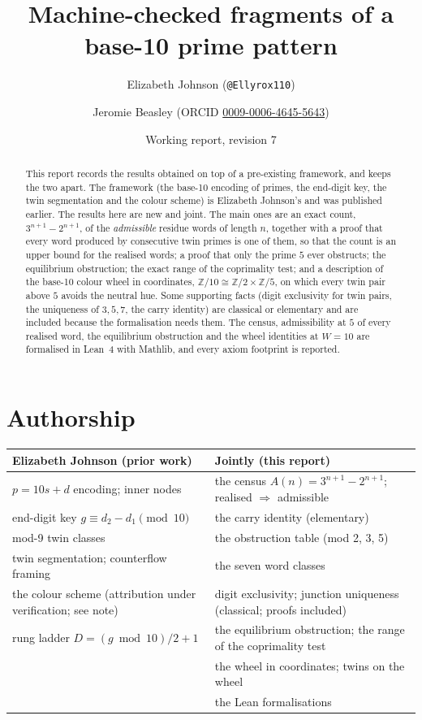 \documentclass[11pt]{article}
\title{\bfseries Machine-checked fragments of a\\ base-10 prime pattern}
\author{Elizabeth Johnson (\texttt{@Ellyrox110}) \and Jeromie Beasley (ORCID \href{https://orcid.org/0009-0006-4645-5643}{0009-0006-4645-5643})}
\date{Working report, revision 7}
\newcommand{\Z}{\mathbb Z}
\theoremstyle{plain}
\theoremstyle{definition}
\theoremstyle{remark}
\begin{document}
\maketitle

\begin{abstract}
\noindent
This report records the results obtained on top of a pre-existing framework, and keeps the two
apart. The framework (the base-10 encoding of primes, the end-digit key, the twin segmentation and
the colour scheme) is Elizabeth Johnson's and was published earlier. The results here are new and
joint. The main ones are an exact count, $3^{n+1}-2^{n+1}$, of the \emph{admissible} residue words
of length $n$, together with a proof that every word produced by consecutive twin primes is one of
them, so that the count is an upper bound for the realised words; a proof that only the prime $5$
ever obstructs; the equilibrium obstruction; the exact range of the coprimality test; and a
description of the base-10 colour wheel in coordinates, $\Z/10\cong\Z/2\times\Z/5$, on which every
twin pair above $5$ avoids the neutral hue. Some supporting facts (digit exclusivity for twin
pairs, the uniqueness of $3,5,7$, the carry identity) are classical or elementary and are included
because the formalisation needs them. The census, admissibility at $5$ of every realised word, the
equilibrium obstruction and the wheel identities at $W=10$ are formalised in Lean~4 with Mathlib,
and every axiom footprint is reported.
\end{abstract}

\section*{Authorship}

\begin{center}
\begin{tabular}{@{}p{}p{}@{}}
\toprule
\textbf{Elizabeth Johnson (prior work)} & \textbf{Jointly (this report)}\\
\midrule
$p=10s+d$ encoding; inner nodes & the census $A(n)=3^{n+1}-2^{n+1}$; realised $\Rightarrow$ admissible\\
end-digit key $g\equiv d_2-d_1 \pmod{10}$ & the carry identity (elementary)\\
mod-9 twin classes & the obstruction table (mod 2, 3, 5)\\
twin segmentation; counterflow framing & the seven word classes\\
the colour scheme (attribution under verification; see note) & digit exclusivity; junction uniqueness (classical; proofs included)\\
rung ladder $D=(g\bmod 10)/2+1$ & the equilibrium obstruction; the range of the coprimality test\\
 & the wheel in coordinates; twins on the wheel\\
 & the Lean formalisations\\
\bottomrule
\end{tabular}
\end{center}
\end{document}
